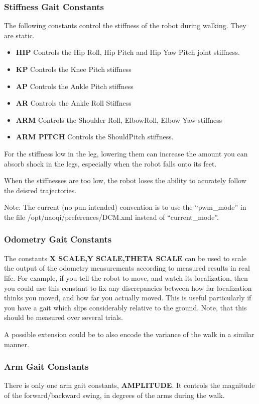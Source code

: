\documentclass[11pt]{article}
\begin{document}
\subsubsection{Stiffness Gait Constants}

The following constants control the stiffness of the robot during walking.
They are static.
\begin{itemize}
\item {\bf HIP} Controls the Hip Roll, Hip Pitch and Hip Yaw Pitch joint
stiffness.
\item {\bf KP} Controls the Knee Pitch stiffness
\item {\bf AP} Controls the Ankle Pitch stiffness
\item {\bf AR} Controls the Ankle Roll Stiffness
\item {\bf ARM} Controls the Shoulder Roll, ElbowRoll, Elbow Yaw stiffness
\item {\bf ARM PITCH} Controls the ShouldPitch stiffness.
\end{itemize}

For the stiffness low in the leg, lowering them can increase the amount you
can absorb shock in the legs, especially when the robot falls onto its feet.

When the stiffnesses are too low, the robot loses the ability to acurately
follow the deisred trajectories.

Note: The current (no pun intended) convention is to use the ``pwm\_mode'' in
the file /opt/naoqi/preferences/DCM.xml instead of ``current\_mode''.

\subsubsection{Odometry Gait Constants}

The constants {\bf X SCALE,Y SCALE,THETA SCALE} can be used to scale the output
of the odometry measurements according to measured results in real life.
For example, if you tell the robot to move, and watch its localization, then
you could use this constant to fix any discrepancies between how far 
localization thinks you moved, and how far you actually moved.  This is useful
particularly if you have a gait which slips considerably relative to the 
ground. Note, that this should be measured over several trials.

A possible extension could be to also encode the variance of the walk in
a similar manner.

\subsubsection{Arm Gait Constants}
There is only one arm gait constants, {\bf AMPLITUDE}. It controls 
the magnitude of the forward/backward swing, in degrees of the arms during
the walk.
\end{document}
